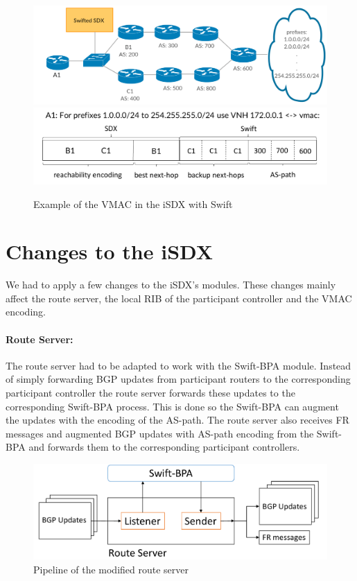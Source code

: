 \begin{figure}[h]
\center
\includegraphics[scale = 0.24]{Figures/design_vmac_topology.pdf}
\includegraphics[scale = 0.35]{Figures/design_vmac_cropped.pdf}
\caption{Example of the VMAC in the iSDX with Swift}
\label{fig:sixdsvmac}
\end{figure}

\section{\label{chapter4:Changes_to_the_iSDX}Changes to the iSDX}

We had to apply a few changes to the iSDX's modules. These changes mainly affect the route server, the local RIB of the participant controller and the VMAC encoding. 

\paragraph{\label{chapter4:Changes to the iSDX:route server}Route Server:}

The route server had to be adapted to work with the Swift-BPA module. 
Instead of simply forwarding BGP updates from participant routers to the corresponding participant controller the route server forwards these updates to the corresponding Swift-BPA process. This is done so the Swift-BPA can augment the updates with the encoding of the AS-path. The route server also receives FR messages and augmented BGP updates with AS-path encoding from the Swift-BPA and forwards them to the corresponding participant controllers. 
\begin{figure}[h]
\center
\includegraphics[scale = 0.45]{Figures/design_route_server_cropped2.pdf}
\caption{Pipeline of the modified route server}
\end{figure}



